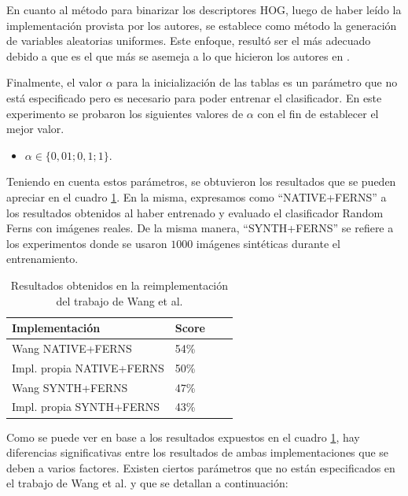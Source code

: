 	En cuanto al método para binarizar los descriptores HOG, luego de haber leído la implementación provista por los autores, se establece como método la generación de variables aleatorias uniformes. Este enfoque, resultó ser el más adecuado debido a que es el que más se asemeja a lo que hicieron los autores en \cite{wang}	.
	
	Finalmente, el valor $\alpha$ para la inicialización de las tablas es un parámetro que no está especificado pero es necesario para poder entrenar el clasificador. En este experimento se probaron los siguientes valores de $\alpha$ con el fin de establecer el mejor valor.
	
	\begin{itemize}
		\item $\alpha \in \{0,01; 0,1; 1\}$.
	\end{itemize}
	
	Teniendo en cuenta estos parámetros, se obtuvieron los resultados que se pueden apreciar en el cuadro \ref{table: Baseline-Table}. En la misma, expresamos como ``NATIVE+FERNS'' a los resultados obtenidos al haber entrenado y evaluado el clasificador Random Ferns con imágenes reales. De la misma manera, ``SYNTH+FERNS'' se  refiere a los experimentos donde se usaron $1000$ imágenes sintéticas durante el entrenamiento.

	\begin{table}
		\centering
	    \begin{tabular}{ | l | l | l | p{5cm} |}
    			\hline
    				\textbf{Implementación} & \textbf{Score} \\ \hline
    				Wang NATIVE+FERNS & 54\% \\ \hline
    				Impl. propia NATIVE+FERNS & 50\% \\ \hline
    				Wang SYNTH+FERNS & 47\% \\ \hline
    				Impl. propia SYNTH+FERNS & 43\% \\

    			\hline
    		\end{tabular}
    		\caption[Resultados reales y sintéticas para baseline]{Resultados obtenidos en la reimplementación del trabajo de Wang et al.}
    		\label{table: Baseline-Table}
	\end{table}

	Como se puede ver en base a los resultados expuestos en el cuadro \ref{table: Baseline-Table}, hay diferencias significativas entre los resultados de ambas implementaciones que se deben a varios factores. Existen ciertos parámetros que no están especificados en el trabajo de Wang et al. y que se detallan a continuación:
	
